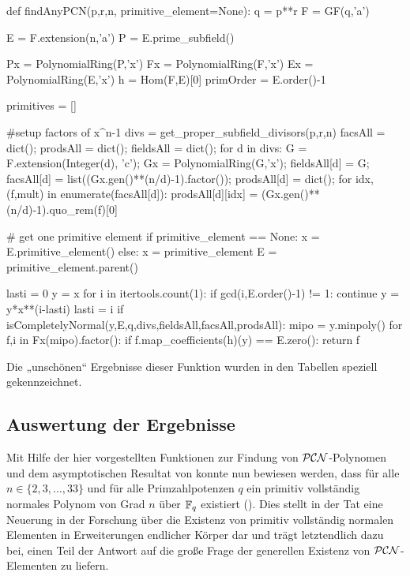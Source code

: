 \begin{sagecode}[caption={[\texttt{findAnyPCN} aus 
 \url{../Sage/findAnyPCN_additional.spyx}]Aus \url{../Sage/findAnyPCN_additional.spyx}}]
def findAnyPCN(p,r,n, primitive_element=None):
    q = p**r
    F = GF(q,'a')

    E = F.extension(n,'a')
    P = E.prime_subfield()

    Px = PolynomialRing(P,'x')
    Fx = PolynomialRing(F,'x')
    Ex = PolynomialRing(E,'x')
    h = Hom(F,E)[0]
    primOrder = E.order()-1
    
    primitives = []
    
    #setup factors of x^n-1
    divs = get_proper_subfield_divisors(p,r,n)
    facsAll = dict();
    prodsAll = dict();
    fieldsAll = dict();
    for d in divs:
        G = F.extension(Integer(d), 'c');
        Gx = PolynomialRing(G,'x');
        fieldsAll[d] = G;
        facsAll[d] = list((Gx.gen()**(n/d)-1).factor());
        prodsAll[d] = dict();
        for idx,(f,mult) in enumerate(facsAll[d]):
            prodsAll[d][idx] = (Gx.gen()**(n/d)-1).quo_rem(f)[0]
    
    # get one primitive element
    if primitive_element == None:
        x = E.primitive_element()
    else:
        x = primitive_element
        E = primitive_element.parent()
    
    lasti = 0
    y = x
    for i in itertools.count(1):
        if gcd(i,E.order()-1) != 1: continue
        y = y*x**(i-lasti)
        lasti = i
        if isCompletelyNormal(y,E,q,divs,fieldsAll,facsAll,prodsAll):
            mipo = y.minpoly()
            for f,i in Fx(mipo).factor():
                if f.map_coefficients(h)(y) == E.zero():
                    return f
\end{sagecode}


Die „unschönen“ Ergebnisse dieser Funktion wurden in den Tabellen speziell
gekennzeichnet.


\subsection{Auswertung der Ergebnisse}

Mit Hilfe der hier vorgestellten Funktionen zur Findung von $\mathcal{PCN}$-Polynomen
und dem asymptotischen Resultat  von 
\citeauthor{hachenberger2014}
konnte nun bewiesen werden, dass für alle $n \in \{ 2,3,\ldots,33\}$ und für
alle Primzahlpotenzen $q$ ein primitiv vollständig normales Polynom von Grad
$n$ über $\mathbb{F}_q$ existiert (). Dies stellt in der Tat
eine Neuerung in der Forschung über die Existenz von primitiv vollständig
normalen Elementen in Erweiterungen endlicher Körper dar und trägt letztendlich
dazu bei, einen Teil der Antwort auf die große Frage der generellen Existenz
von $\mathcal{PCN}$-Elementen zu liefern.

